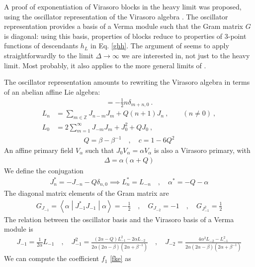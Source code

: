 \documentclass[12pt,a4paper]{article}
\begin{document}
A proof of exponentiation of Virasoro blocks in the heavy limit was proposed, using the oscillator representation of the Virasoro algebra \cite{bdk19}. The oscillator representation provides a basis of a Verma module such that the Gram matrix $G$ is diagonal: using this basis, properties of blocks reduce to properties of 3-point functions of descendants $h_L$ in Eq. \eqref{ghh}. The argument of \cite{bdk19} seems to apply straightforwardly to the limit $\Delta\to\infty$ we are interested in, not just to the heavy limit. Most probably, it also applies to the more general limits of \cite{al24}. 

The oscillator representation amounts to rewriting the Virasoro algebra in terms of an abelian affine Lie algebra: 
\begin{align}
 [J_m,J_n] = -\frac12 n\delta_{m+n,0}\ . 
\end{align}
\begin{align}
 L_n &= \sum_{m\in{\mathbb{Z}}} J_{n-m}J_m + Q(n+1)J_n\ , \qquad (n\neq 0)\ ,
\label{lnj}
\\
L_0 &=2\sum_{m=1}^\infty J_{-m}J_m +J_0^2+QJ_0 \ ,
\label{lzj}
\end{align}
\begin{align}
 Q = \beta -\beta^{-1} \quad , \quad c = 1-6Q^2
\end{align}
An affine primary field $V_\alpha$ such that $J_0V_\alpha = \alpha V_\alpha$ is also a Virasoro primary, with 
\begin{align}
 \Delta = \alpha(\alpha + Q)
\end{align}
We define the conjugation 
\begin{align}
 J_n^* = -J_{-n}-Q\delta_{n,0} \implies L_n^* = L_{-n} \quad , \quad \alpha^*=-Q-\alpha
\end{align}
The diagonal matrix elements of the Gram matrix are 
\begin{align}
 G_{J_{-1}} = \left<\alpha\middle|J_{-1}^*J_{-1}\middle|\alpha\right>= -\frac12  \quad , \quad G_{J_{-2}} = -1 \quad ,\quad G_{J_{-1}^2} = \frac12
\end{align}
The relation between the oscillator basis and the Virasoro basis of a Verma module is 
\begin{align}
 J_{-1} = \frac{1}{2\alpha} L_{-1} \quad , \quad J_{-1}^2 = \frac{(2\alpha-Q)L_{-1}^2 -2\alpha L_{-2}}{2\alpha(2\alpha-\beta)(2\alpha+\beta^{-1})} \quad , \quad J_{-2} = \frac{4\alpha^2 L_{-2}-L_{-1}^2}{2\alpha(2\alpha-\beta)(2\alpha+\beta^{-1})}
 \label{jl}
\end{align}
We can compute the coefficient $f_1$ \eqref{fke} as 
\end{document}
